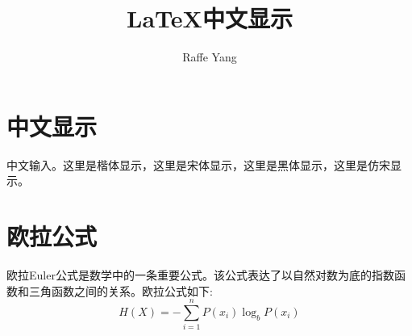\documentclass[UTF8]{article}
\author{Raffe Yang}
\title{\LaTeX 中文显示}
\begin{document}
    \maketitle
\section{中文显示}
    中文输入。{\kaishu 这里是楷体显示}，{\songti 这里是宋体显示}，{\heiti 这里是黑体显示}，{\fangsong 这里是仿宋显示}。
\section{欧拉公式}
欧拉Euler公式是数学中的一条重要公式。该公式表达了以自然对数为底的指数函数和三角函数之间的关系。欧拉公式如下:
\[
H(X) = -\sum_{i=1}^{n} P(x_i) \log_b P(x_i)
\]
\end{document}
